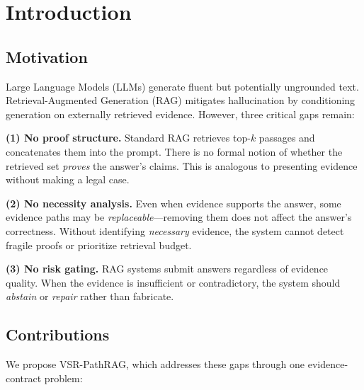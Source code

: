 \documentclass[journal,onecolumn,11pt]{IEEEtran}
\begin{document}
\section{Introduction}

\subsection{Motivation}

Large Language Models (LLMs) generate fluent but potentially ungrounded text. Retrieval-Augmented Generation (RAG) mitigates hallucination by conditioning generation on externally retrieved evidence. However, three critical gaps remain:

\textbf{(1) No proof structure.} Standard RAG retrieves top-$k$ passages and concatenates them into the prompt. There is no formal notion of whether the retrieved set \textit{proves} the answer's claims. This is analogous to presenting evidence without making a legal case.

\textbf{(2) No necessity analysis.} Even when evidence supports the answer, some evidence paths may be \textit{replaceable}---removing them does not affect the answer's correctness. Without identifying \textit{necessary} evidence, the system cannot detect fragile proofs or prioritize retrieval budget.

\textbf{(3) No risk gating.} RAG systems submit answers regardless of evidence quality. When the evidence is insufficient or contradictory, the system should \textit{abstain} or \textit{repair} rather than fabricate.

\subsection{Contributions}

We propose VSR-PathRAG, which addresses these gaps through one evidence-contract problem:
\end{document}
